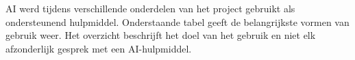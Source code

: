 \section{}%
\label{sec:ai-waarvoor}
AI werd tijdens verschillende onderdelen van het project gebruikt als ondersteunend hulpmiddel. Onderstaande tabel geeft de belangrijkste vormen van gebruik weer. Het overzicht beschrijft het doel van het gebruik en niet elk afzonderlijk gesprek met een AI-hulpmiddel.
